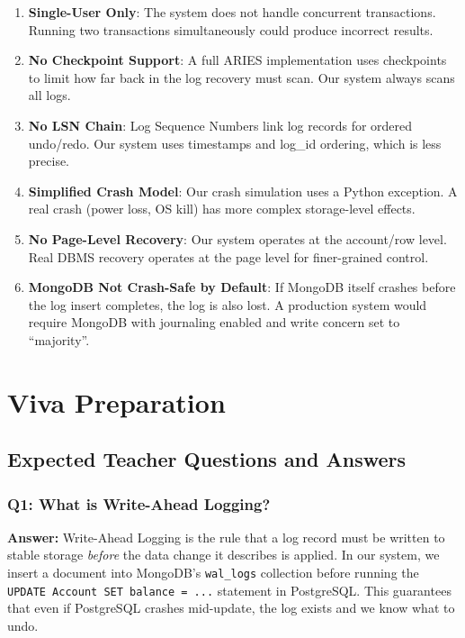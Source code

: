 \begin{enumerate}
  \item \textbf{Single-User Only}: The system does not handle concurrent
        transactions. Running two transactions simultaneously could
        produce incorrect results.

  \item \textbf{No Checkpoint Support}: A full ARIES implementation uses
        checkpoints to limit how far back in the log recovery must scan.
        Our system always scans all logs.

  \item \textbf{No LSN Chain}: Log Sequence Numbers link log records for
        ordered undo/redo. Our system uses timestamps and log\_id ordering,
        which is less precise.

  \item \textbf{Simplified Crash Model}: Our crash simulation uses a
        Python exception. A real crash (power loss, OS kill) has more
        complex storage-level effects.

  \item \textbf{No Page-Level Recovery}: Our system operates at the
        account/row level. Real DBMS recovery operates at the page level
        for finer-grained control.

  \item \textbf{MongoDB Not Crash-Safe by Default}: If MongoDB itself
        crashes before the log insert completes, the log is also lost.
        A production system would require MongoDB with journaling enabled
        and write concern set to ``majority''.
\end{enumerate}

\chapter{Viva Preparation}

\section{Expected Teacher Questions and Answers}

\subsection{Q1: What is Write-Ahead Logging?}

\textbf{Answer:} Write-Ahead Logging is the rule that a log record must be
written to stable storage \textit{before} the data change it describes is
applied. In our system, we insert a document into MongoDB's \texttt{wal\_logs}
collection before running the \texttt{UPDATE Account SET balance = ...}
statement in PostgreSQL. This guarantees that even if PostgreSQL crashes
mid-update, the log exists and we know what to undo.

